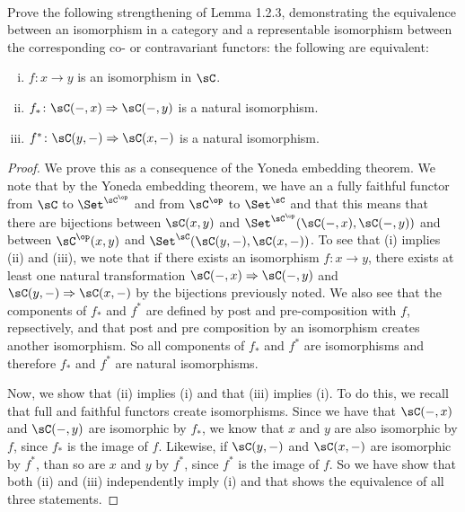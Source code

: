 \documentclass[main.tex]{subfiles}
\begin{document}
\paragraph{}
\begin{exercise}
Prove the following strengthening of Lemma 1.2.3, demonstrating the equivalence between an isomorphism in a category and a representable isomorphism between the corresponding co- or contravariant functors: the following are equivalent:
\end{exercise}

\begin{enumerate}[(i)]
\item $f\colon x \rightarrow y$ is an isomorphism in $\sC$.
\item $f_*\colon \sC(-,x) \Rightarrow \sC(-,y)$ is a natural isomorphism. 
\item $f^{*}\colon \sC(y,-) \Rightarrow \sC(x,-)$ is a natural isomorphism. 
\end{enumerate}

\begin{proof}
We prove this as a consequence of the Yoneda embedding theorem. We note that by 
the Yoneda embedding theorem, we have an a fully faithful functor from $\sC$ to 
$\Set^{\sC^{\op}}$ and from 
$\sC^{\op}$ to $\Set^{\sC}$ and that this means that there are bijections 
between $\sC(x,y)$ and $\Set^{\sC^{\op}}(\sC(-,x),\sC(-,y))$ and between  
$\sC^{\op}(x,y)$ and 
$\Set^{\sC}(\sC(y,-),\sC(x,-))$. To see that (i) implies (ii) and (iii), we 
note that if there exists an isomorphism $f\colon x \rightarrow y$, there 
exists at least 
one natural 
transformation $\sC(-,x) \Rightarrow \sC(-,y)$ and $\sC(y,-) \Rightarrow 
\sC(x,-)$ by the bijections previously noted. We also see that the components 
of $f_*$ and 
$f^{*}$ are 
defined by post and pre-composition with $f$, repsectively, and that post and 
pre composition by an isomorphism creates another isomorphism. So all 
components of $f_*$ 
and $f^{*}$ are isomorphisms and therefore $f_*$ and $f^{*}$ are natural 
isomorphisms. 

Now, we show that (ii) implies (i) and that (iii) implies (i). To do this, we 
recall that full and faithful functors create isomorphisms. Since we have that 
$\sC(-,x)$ 
and $\sC(-,y)$ are isomorphic by $f_*$, we know that $x$ and $y$ are also 
isomorphic by $f$, since $f_*$ is the image of $f$. Likewise, if $\sC(y,-)$ and 
$\sC(x,-)$ are 
isomorphic by $f^{*}$, than so are $x$ and $y$ by $f^{*}$, since $f^{*}$ is the 
image of $f$. So we have show that both (ii) and (iii) independently imply (i) 
and that shows the equivalence of all three statements.

\end{proof}
\end{document}

